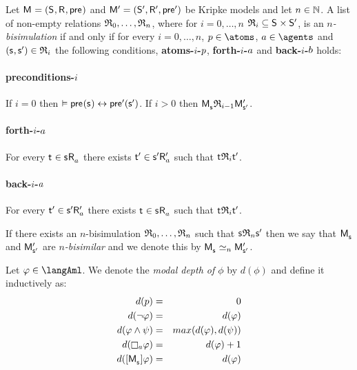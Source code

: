 \begin{definition}[$n$-bisimulation]
Let $\aModelAndTuple$ and $\aModelAndTupleP$ be Kripke models and let $n \in \mathbb{N}$.
A list of non-empty relations $\mathfrak{R}_0, \dots, \mathfrak{R}_n$, where for $i = 0, \dots, n$ $\bisimulation_i \subseteq \aStates \times \aStatesP$, is an {\em $n$-bisimulation} if and only if for every $i = 0, \dots, n$, $\atomP \in \atoms$, $\agentA \in \agents$ and $(\aStateS, \aStateSP) \in \bisimulation_i$ the following conditions, {\bf atoms-$i$-$p$}, {\bf forth-$i$-$a$} and {\bf back-$i$-$b$} holds:

\paragraph{preconditions-$i$}
If $i = 0$ then $\entails \aPrecondition(\aStateS) \iff \aPreconditionP(\aStateSP)$.
If $i > 0$ then $\aPModel{\aStateS} \bisimulation_{i-1} \aPModelP{\aStateSP}$.

\paragraph{forth-$i$-$a$}
For every $\aStateT \in \aSuccessorsA{\aStateS}$ there exists ${\mathsf{{t}}^{\prime}} \in {{\mathsf{{s}}^{\prime}}} {\mathsf{R}^{\prime}_{a}}$ such that $\aStateT \bisimulation_i \aStateTP$.

\paragraph{back-$i$-$a$}
For every ${\mathsf{{t}}^{\prime}} \in {{\mathsf{{s}}^{\prime}}} {\mathsf{R}^{\prime}_{a}}$ there exists $\aStateT \in \aSuccessorsA{\aStateS}$ such that $\aStateT \bisimulation_i \aStateTP$.

If there exists an $n$-bisimulation $\mathfrak{R}_0, \dots, \mathfrak{R}_n$ such that $\aStateS \bisimulation_n \aStateSP$ then we say that $\aPModel{\aStateS}$ and ${\mathsf{M}^{\prime}_{{\mathsf{{s}}^{\prime}}}}$ are {\em $n$-bisimilar} and we denote this by $\aPModel{\aStateS} \bisimilar[n] \aPModelP{\aStateSP}$.
\end{definition}

\begin{definition}
Let $\phi \in \langAml$.
We denote the {\em modal depth of $\phi$} by $d(\phi)$ and define it inductively as:
\begin{eqnarray*}
    d(\atomP) &=& 0\\
    d(\lnot \phi) &=& d(\phi)\\
    d(\phi \land \psi) &=& max(d(\phi), d(\psi))\\
    d(\necessaryA \phi) &=& d(\phi) + 1\\
    d(\actionA{\aPModel{\aStateS}} \phi) &=& d(\phi)
\end{eqnarray*}
\end{definition}


